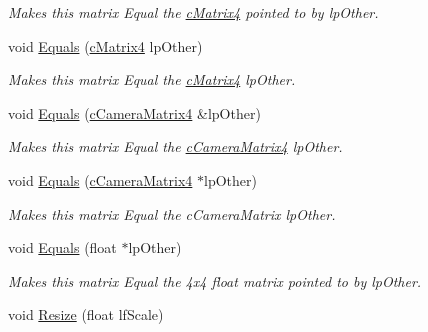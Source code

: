 \begin{DoxyCompactItemize}
\begin{DoxyCompactList}\small\item\em Makes this matrix Equal the \hyperlink{classc_matrix4}{cMatrix4} pointed to by lpOther. \end{DoxyCompactList}\item 
\hypertarget{classc_matrix4_ac5ed8437aa32a05185d51b9472640a8d}{
void \hyperlink{classc_matrix4_ac5ed8437aa32a05185d51b9472640a8d}{Equals} (\hyperlink{classc_matrix4}{cMatrix4} lpOther)}
\label{classc_matrix4_ac5ed8437aa32a05185d51b9472640a8d}

\begin{DoxyCompactList}\small\item\em Makes this matrix Equal the \hyperlink{classc_matrix4}{cMatrix4} lpOther. \end{DoxyCompactList}\item 
\hypertarget{classc_matrix4_a0af5e0b1dbbe6d7f4c512a5f07f1e273}{
void \hyperlink{classc_matrix4_a0af5e0b1dbbe6d7f4c512a5f07f1e273}{Equals} (\hyperlink{classc_camera_matrix4}{cCameraMatrix4} \&lpOther)}
\label{classc_matrix4_a0af5e0b1dbbe6d7f4c512a5f07f1e273}

\begin{DoxyCompactList}\small\item\em Makes this matrix Equal the \hyperlink{classc_camera_matrix4}{cCameraMatrix4} lpOther. \end{DoxyCompactList}\item 
\hypertarget{classc_matrix4_a12b028ad76a776c5a01d695ea620962b}{
void \hyperlink{classc_matrix4_a12b028ad76a776c5a01d695ea620962b}{Equals} (\hyperlink{classc_camera_matrix4}{cCameraMatrix4} $\ast$lpOther)}
\label{classc_matrix4_a12b028ad76a776c5a01d695ea620962b}

\begin{DoxyCompactList}\small\item\em Makes this matrix Equal the cCameraMatrix lpOther. \end{DoxyCompactList}\item 
\hypertarget{classc_matrix4_adb76264fa82ef10ebb24b64d6293bc9d}{
void \hyperlink{classc_matrix4_adb76264fa82ef10ebb24b64d6293bc9d}{Equals} (float $\ast$lpOther)}
\label{classc_matrix4_adb76264fa82ef10ebb24b64d6293bc9d}

\begin{DoxyCompactList}\small\item\em Makes this matrix Equal the 4x4 float matrix pointed to by lpOther. \end{DoxyCompactList}\item 
\hypertarget{classc_matrix4_a4785b8464f65d9784db634f3a6f34e52}{
void \hyperlink{classc_matrix4_a4785b8464f65d9784db634f3a6f34e52}{Resize} (float lfScale)}
\label{classc_matrix4_a4785b8464f65d9784db634f3a6f34e52}


\end{DoxyCompactItemize}
